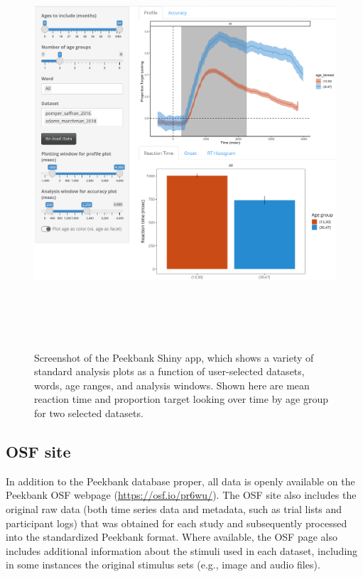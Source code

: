 \documentclass[
  english,
  man,floatsintext]{apa6}
\providecommand{\DIFdeltex}[1]{}                      %
\providecommand{\DIFdelbegin}{} %
\providecommand{\DIFdelend}{} %
\providecommand{\DIFdel}[1]{\texorpdfstring{\DIFdeltex{#1}}{}} %
\newcommand{\DIFscaledelfig}{0.5}
\newlength{\DIFdelgraphicswidth} %
\newlength{\DIFdelgraphicsheight} %
\newcommand{\DIFdelincludegraphics}[2][]{%
\sbox{\DIFdelgraphicsbox}{\DIFOincludegraphics[#1]{#2}}%
\settoboxwidth{\DIFdelgraphicswidth}{\DIFdelgraphicsbox} %
\settoboxtotalheight{\DIFdelgraphicsheight}{\DIFdelgraphicsbox} %
\scalebox{\DIFscaledelfig}{%
\parbox[b]{\DIFdelgraphicswidth}{\usebox{\DIFdelgraphicsbox}\\[-\baselineskip] \rule{\DIFdelgraphicswidth}{0em}}\llap{\resizebox{\DIFdelgraphicswidth}{\DIFdelgraphicsheight}{%
\setlength{\unitlength}{\DIFdelgraphicswidth}%
\begin{picture}(1,1)%
\thicklines\linethickness{2pt} %
{\color[rgb]{1,0,0}\put(0,0){\framebox(1,1){}}}%
{\color[rgb]{1,0,0}\put(0,0){\line( 1,1){1}}}%
{\color[rgb]{1,0,0}\put(0,1){\line(1,-1){1}}}%
\end{picture}%
}\hspace*{3pt}}} %
} %
\DeclareRobustCommand{\DIFdelbegin}{\DIFOdelbegin \let\includegraphics\DIFdelincludegraphics} %
\DeclareRobustCommand{\DIFdelend}{\DIFOaddend \let\includegraphics\DIFOincludegraphics} %
\begin{document}
\begin{figure}

{\centering \includegraphics[width=6.94in,height=6in]{brm/figures/shiny-full-window}

}

\caption{Screenshot of the Peekbank Shiny app, which shows a variety of standard analysis plots as a function of user-selected datasets, words, age ranges, and analysis windows. Shown here are mean reaction time and proportion target looking over time by age group for two selected datasets.}\label{fig:shiny}
\end{figure}

\hypertarget{osf-site}{%
\subsection{OSF site}\label{osf-site}}

In addition to the Peekbank database proper, all data is openly available on the Peekbank OSF webpage (\url{https://osf.io/pr6wu/}).
The OSF site also includes the original raw data (both time series data and metadata, such as trial lists and participant logs) that was obtained for each study and subsequently processed into the standardized Peekbank format.
\DIFdelbegin \DIFdel{Users who are interested in inspecting or reproducing the processing pipeline for a given dataset can use the respective import script (openly available on GitHub, }%
\DIFdel{) to download and process the raw data from OSF into its final standardized format.
}\DIFdelend Where available, the OSF page also includes additional information about the stimuli used in each dataset, including in some instances the original stimulus sets (e.g., image and audio files).
\end{document}
